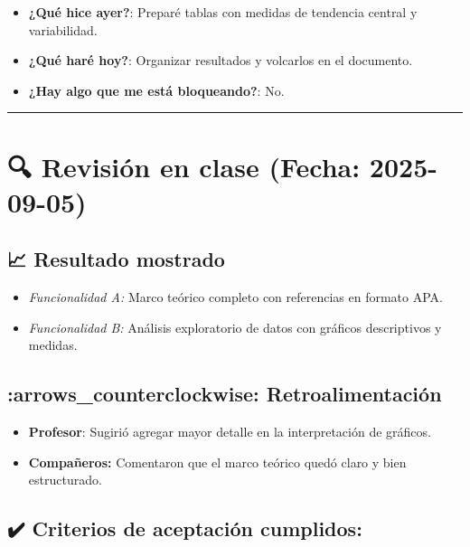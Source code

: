 \documentclass[
  11pt,
]{article}
\providecommand{\tightlist}{%
  \setlength{\itemsep}{0pt}\setlength{\parskip}{0pt}}
\begin{document}
\begin{itemize}
\tightlist
\item
  \textbf{¿Qué hice ayer?}: Preparé tablas con medidas de tendencia
  central y variabilidad.
\item
  \textbf{¿Qué haré hoy?}: Organizar resultados y volcarlos en el
  documento.
\item
  \textbf{¿Hay algo que me está bloqueando?}: No.
\end{itemize}

\begin{center}\rule{0.5\linewidth}{0.5pt}\end{center}

\section{🔍 Revisión en clase (Fecha:
2025-09-05)}\label{revisiuxf3n-en-clase-fecha-2025-09-05}

\subsection{📈 Resultado mostrado}\label{resultado-mostrado}

\begin{itemize}
\tightlist
\item
  \emph{Funcionalidad A:} Marco teórico completo con referencias en
  formato APA.
\item
  \emph{Funcionalidad B:} Análisis exploratorio de datos con gráficos
  descriptivos y medidas.
\end{itemize}

\subsection{:arrows\_counterclockwise:
Retroalimentación}\label{arrows_counterclockwise-retroalimentaciuxf3n}

\begin{itemize}
\tightlist
\item
  \textbf{Profesor}: Sugirió agregar mayor detalle en la interpretación
  de gráficos.
\item
  \textbf{Compañeros:} Comentaron que el marco teórico quedó claro y
  bien estructurado.
\end{itemize}

\subsection{✔️ Criterios de aceptación
cumplidos:}\label{criterios-de-aceptaciuxf3n-cumplidos}
\end{document}
